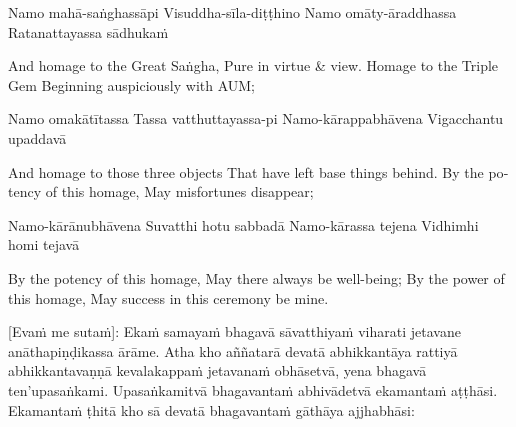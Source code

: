 Namo mahā-saṅghassāpi
Visuddha-sīla-diṭṭhino
Namo omāty-āraddhassa
Ratanattayassa sādhukaṁ

\begin{english}
And homage to the Great Saṅgha,
Pure in virtue \& view.
Homage to the Triple Gem
Beginning auspiciously with AUM;
\end{english}

Namo omakātītassa
Tassa vatthuttayassa-pi
Namo-kārappabhāvena
Vigacchantu upaddavā

\begin{english}
And homage to those three objects
That have left base things behind.
By the potency of this homage,
May misfortunes disappear;
\end{english}

Namo-kārānubhāvena
Suvatthi hotu sabbadā
Namo-kārassa tejena
Vidhimhi homi tejavā

\begin{english}
By the potency of this homage,
May there always be well-being;
By the power of this homage,
May success in this ceremony be mine.
\end{english}

\suttaRef{[Thai]}

[Evaṁ me sutaṁ]: Ekaṁ samayaṁ bhagavā sāvatthiyaṁ viharati jetavane anāthapiṇḍikassa ārāme. Atha kho aññatarā devatā abhikkantāya rattiyā abhikkantavaṇṇā kevalakappaṁ jetavanaṁ obhāsetvā, yena bhagavā ten’upasaṅkami. Upasaṅkamitvā bhagavantaṁ abhivādetvā ekamantaṁ aṭṭhāsi. Ekamantaṁ ṭhitā kho sā devatā bhagavantaṁ gāthāya ajjhabhāsi:

